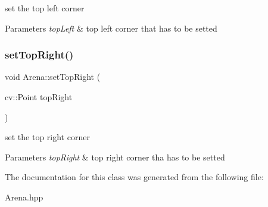 set the top left corner 
\begin{DoxyParams}{Parameters}
{\em top\+Left} & top left corner that has to be setted \\
\hline
\end{DoxyParams}
\mbox{\label{class_arena_a82c7fa04e8acf52f6edecc1ee1c38001}} 
\subsubsection{\texorpdfstring{set\+Top\+Right()}{setTopRight()}}
{\footnotesize\ttfamily void Arena\+::set\+Top\+Right (\begin{DoxyParamCaption}\item[{cv\+::\+Point}]{top\+Right }\end{DoxyParamCaption})}

set the top right corner 
\begin{DoxyParams}{Parameters}
{\em top\+Right} & top right corner tha has to be setted \\
\hline
\end{DoxyParams}


The documentation for this class was generated from the following file\+:\begin{DoxyCompactItemize}
\item 
Arena.\+hpp\end{DoxyCompactItemize}

